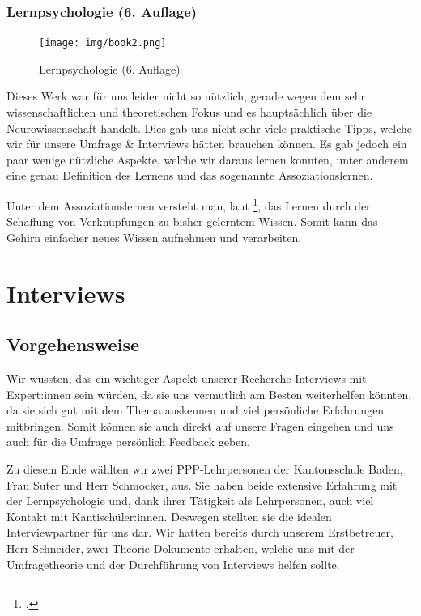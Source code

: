 \documentclass[12pt,a4paper]{report}
\begin{document}
\subsubsection{Lernpsychologie (6. Auflage)}
\begin{figure}[H]
    \centering
    \texttt{[image: img/book2.png]}
    \caption{Lernpsychologie (6. Auflage)}
\end{figure}


Dieses Werk war für uns leider nicht so nützlich, gerade wegen dem sehr wissenschaftlichen und theoretischen Fokus und es hauptsächlich über die Neurowissenschaft handelt.
Dies gab uns nicht sehr viele praktische Tipps, welche wir für unsere Umfrage \& Interviews hätten brauchen können. 
Es gab jedoch ein paar wenige nützliche Aspekte, welche wir daraus lernen konnten, unter anderem eine genau Definition des Lernens und das sogenannte Assoziationslernen.

Unter dem Assoziationslernen versteht man, laut \footcite{Book2}, das Lernen durch der Schaffung von Verknüpfungen zu bisher gelerntem Wissen. 
Somit kann das Gehirn einfacher neues Wissen aufnehmen und verarbeiten.

\section{Interviews}

\subsection {Vorgehensweise}
Wir wussten, das ein wichtiger Aspekt unserer Recherche Interviews mit Expert:innen sein würden, da sie uns vermutlich am Besten weiterhelfen könnten, da sie sich gut mit dem Thema auskennen und viel persönliche Erfahrungen mitbringen.
Somit können sie auch direkt auf unsere Fragen eingehen und uns auch für die Umfrage persönlich Feedback geben. 

Zu diesem Ende wählten wir zwei PPP-Lehrpersonen der Kantonsschule Baden, Frau Suter und Herr Schmocker, aus. Sie haben beide extensive Erfahrung mit der Lernpsychologie und, dank ihrer Tätigkeit als Lehrpersonen, auch viel Kontakt mit Kantischüler:innen.
Deswegen stellten sie die idealen Interviewpartner für uns dar. Wir hatten bereits durch unserem Erstbetreuer, Herr Schneider, zwei Theorie-Dokumente erhalten, welche uns mit der Umfragetheorie und der Durchführung von Interviews helfen sollte.
\end{document}
